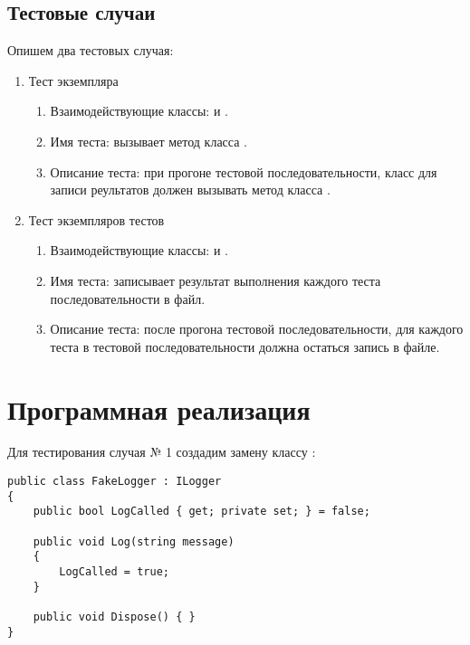 \documentclass[a4paper,14pt]{extarticle}
\begin{document}
\subsection{Тестовые случаи}
Опишем два тестовых случая:
\begin{enumerate}
    \item Тест экземпляра 
    \begin{enumerate} 
        \item Взаимодействующие классы:  и .
        \item Имя теста:  вызывает метод  класса
              .
        \item Описание теста: при прогоне тестовой последовательности, класс
               для записи реультатов должен вызывать
              метод  класса .
    \end{enumerate}

    \item Тест экземпляров тестов
    \begin{enumerate}
        \item Взаимодействующие классы:  и .
        \item Имя теста:  записывает результат выполнения каждого теста
              последовательности в файл.
        \item Описание теста: после прогона тестовой последовательности, для каждого теста в тестовой
              последовательности должна остаться запись в файле. 
    \end{enumerate}
\end{enumerate}

\section{Программная реализация}
Для тестирования случая № 1 создадим замену классу :
\begin{lstlisting}
public class FakeLogger : ILogger
{
    public bool LogCalled { get; private set; } = false;

    public void Log(string message)
    {
        LogCalled = true;
    }

    public void Dispose() { }
}
\end{lstlisting}
\end{document}

